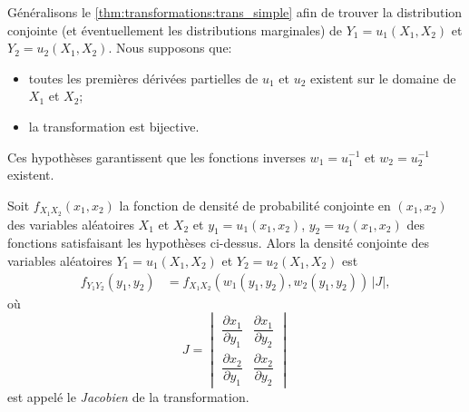 Généralisons le \autoref{thm:transformations:trans_simple} afin
de trouver la distribution conjointe (et éventuellement les
distributions marginales) de $Y_1 = u_1(X_1, X_2)$ et $Y_2 = u_2(X_1,
X_2)$. Nous supposons que:
\begin{itemize}
\item toutes les premières dérivées partielles de $u_1$ et $u_2$
  existent sur le domaine de $X_1$ et $X_2$;
\item la transformation est bijective.
\end{itemize}
Ces hypothèses garantissent que les fonctions inverses $w_1 =
u_1^{-1}$ et $w_2 = u_2^{-1}$ existent.

\begin{thm}
  \label{thm:transformations:trans_multiple}
  Soit $f_{X_1 X_2}(x_1, x_2)$ la fonction de densité de probabilité
  conjointe en $(x_1, x_2)$ des variables aléatoires $X_1$ et $X_2$ et
  $y_1 = u_1(x_1, x_2)$, $y_2 = u_2(x_1, x_2)$ des fonctions
  satisfaisant les hypothèses ci-dessus. Alors la densité conjointe
  des variables aléatoires $Y_1 = u_1(X_1, X_2)$ et $Y_2 = u_2(X_1,
  X_2)$ est
  \begin{align*}
    f_{Y_1 Y_2}(y_1, y_2)
    &= f_{X_1 X_2}(w_1(y_1, y_2), w_2(y_1, y_2))\, |J|,
  \end{align*}
  où
  \begin{displaymath}
    J =
    \begin{vmatrix}
      \dfrac{\partial x_1}{\partial y_1} &
      \dfrac{\partial x_1}{\partial y_2} \\[12pt]
      \dfrac{\partial x_2}{\partial y_1} &
      \dfrac{\partial x_2}{\partial y_2}
    \end{vmatrix}
  \end{displaymath}
  est appelé le \emph{Jacobien} de la transformation.
\end{thm}

